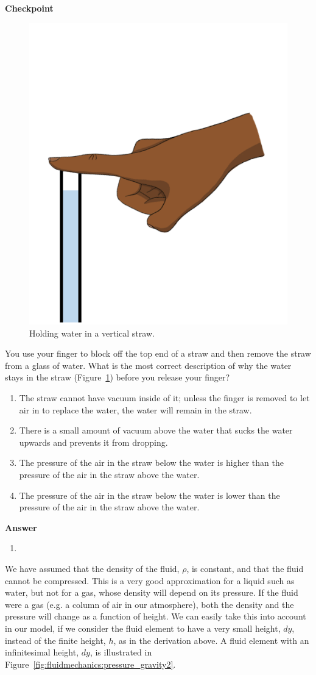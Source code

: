 \begin{framed}
\textbf{Checkpoint}\\
\begin{figure}[!htbp]
\centering
\includegraphics[width=0.3\linewidth]{files/straw-0483ee878cc7e8253673516294129401.png}
\caption[]{Holding water in a vertical straw.}
\label{fig:fluidmechanics:straw}
\end{figure}

You use your finger to block off the top end of a straw and then remove the straw from a glass of water. What is the most correct description of why the water stays in the straw (Figure~\ref{fig:fluidmechanics:straw}) before you release your finger?

\begin{enumerate}
\item The straw cannot have vacuum inside of it; unless the finger is removed to let air in to replace the water, the water will remain in the straw.
\item There is a small amount of vacuum above the water that sucks the water upwards and prevents it from dropping.
\item The pressure of the air in the straw below the water is higher than the pressure of the air in the straw above the water.
\item The pressure of the air in the straw below the water is lower than the pressure of the air in the straw above the water.
\end{enumerate}

\begin{framed}
\textbf{Answer}\\
\begin{enumerate}[resume]
\item
\end{enumerate}
\end{framed}
\end{framed}

We have assumed that the density of the fluid, $\rho$, is constant, and that the fluid cannot be compressed. This is a very good approximation for a liquid such as water, but not for a gas, whose density will depend on its pressure. If the fluid were a gas (e.g. a column of air in our atmosphere), both the density and the pressure will change as a function of height. We can easily take this into account in our model, if we consider the fluid element to have a very small height, $dy$, instead of the finite height, $h$, as in the derivation above. A fluid element with an infinitesimal height, $dy$, is illustrated in Figure~\ref{fig:fluidmechanics:pressure_gravity2}.

